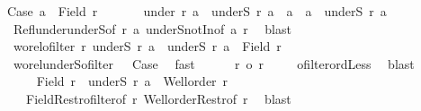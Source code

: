 \begin{isabellebody}
\ Case{}{\isacharcolon}{\kern0pt}\ {\isachardoublequoteopen}a\ {\isasymin}\ Field\ r{\isachardoublequoteclose}\isanewline
\ \ \ \ \isamarkupfalse%
\ {}{\isacharcolon}{\kern0pt}\ {\isachardoublequoteopen}under\ r\ a\ {\isacharequal}{\kern0pt}\ underS\ r\ a\ {\isasymunion}\ {\isacharbraceleft}{\kern0pt}a{\isacharbraceright}{\kern0pt}\ {\isasymand}\ a\ {\isasymnotin}\ underS\ r\ a{\isachardoublequoteclose}\isanewline
\ \ \ \ \isamarkupfalse%
\ {}\ Refl{\isacharunderscore}{\kern0pt}under{\isacharunderscore}{\kern0pt}underS{\isacharbrackleft}{\kern0pt}of\ r\ a{\isacharbrackright}{\kern0pt}\ underS{\isacharunderscore}{\kern0pt}notIn{\isacharbrackleft}{\kern0pt}of\ a\ r{\isacharbrackright}{\kern0pt}\ \isamarkupfalse%
\ blast\isanewline
\ \ \ \ \isamarkupfalse%
\ {}{\isacharcolon}{\kern0pt}\ {\isachardoublequoteopen}wo{\isacharunderscore}{\kern0pt}rel{\isachardot}{\kern0pt}ofilter\ r\ {\isacharparenleft}{\kern0pt}underS\ r\ a{\isacharparenright}{\kern0pt}\ {\isasymand}\ underS\ r\ a\ {\isacharless}{\kern0pt}\ Field\ r{\isachardoublequoteclose}\isanewline
\ \ \ \ \isamarkupfalse%
\ {}\ wo{\isacharunderscore}{\kern0pt}rel{\isachardot}{\kern0pt}underS{\isacharunderscore}{\kern0pt}ofilter\ {\isacharasterisk}{\kern0pt}\ {}\ Case{}\ \isamarkupfalse%
\ fast\isanewline
\ \ \ \ \isamarkupfalse%
\ {\isachardoublequoteopen}{\isacharquery}{\kern0pt}r{\isacharprime}{\kern0pt}\ {\isacharless}{\kern0pt}o\ r{\isachardoublequoteclose}\ \isamarkupfalse%
\ {}\ \isamarkupfalse%
\ ofilter{\isacharunderscore}{\kern0pt}ordLess\ \isamarkupfalse%
\ blast\isanewline
\ \ \ \ \isamarkupfalse%
\isanewline
\ \ \ \ \isamarkupfalse%
\ {\isachardoublequoteopen}Field\ {\isacharquery}{\kern0pt}r{\isacharprime}{\kern0pt}\ {\isacharequal}{\kern0pt}\ underS\ r\ a\ {\isasymand}\ Well{\isacharunderscore}{\kern0pt}order\ {\isacharquery}{\kern0pt}r{\isacharprime}{\kern0pt}{\isachardoublequoteclose}\isanewline
\ \ \ \ \isamarkupfalse%
\ \ {}\ {}\ Field{\isacharunderscore}{\kern0pt}Restr{\isacharunderscore}{\kern0pt}ofilter{\isacharbrackleft}{\kern0pt}of\ r{\isacharbrackright}{\kern0pt}\ Well{\isacharunderscore}{\kern0pt}order{\isacharunderscore}{\kern0pt}Restr{\isacharbrackleft}{\kern0pt}of\ r{\isacharbrackright}{\kern0pt}\ \isamarkupfalse%
\ blast\isanewline

\end{isabellebody}
